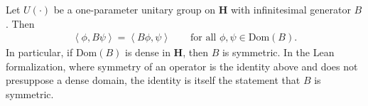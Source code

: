\begin{lemma}
    \label{lmm:generator-symmetry-identity}
    \leanok
    Let $U(\cdot)$ be a one-parameter unitary group on $\mathbf{H}$ with infinitesimal generator $B$. Then
    \begin{align}
        \left< \phi, B\psi \right> = \left< B\phi, \psi \right> \qquad \text{for all } \phi, \psi \in \text{Dom}(B).
    \end{align}
    In particular, if $\text{Dom}(B)$ is dense in $\mathbf{H}$, then $B$ is symmetric. In the Lean formalization, where symmetry of an operator is the identity above and does not presuppose a dense domain, the identity is itself the statement that $B$ is symmetric.
\end{lemma}
